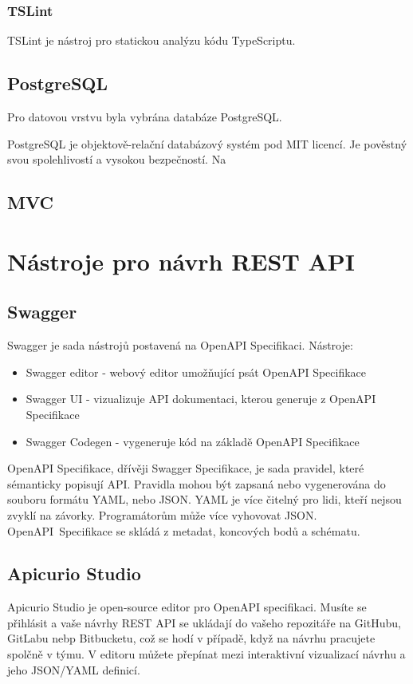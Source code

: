 \documentclass[thesis=B,czech]{FITthesis}[2012/06/26]
\begin{document}
        \subsubsection{TSLint}
            TSLint je nástroj pro statickou analýzu kódu TypeScriptu.
        \subsection{PostgreSQL}
            Pro datovou vrstvu byla vybrána databáze PostgreSQL.
            
            PostgreSQL je objektově-relační databázový systém pod MIT licencí. Je pověstný svou spolehlivostí a vysokou bezpečností. Na %
        \subsection{MVC}
    \section{Nástroje pro návrh REST API}
        \subsection{Swagger}
            Swagger je sada nástrojů postavená na OpenAPI Specifikaci.
            \newline Nástroje:
            \begin{itemize}
                \item Swagger editor - webový editor umožňující psát OpenAPI Specifikace
                \item Swagger UI - vizualizuje API dokumentaci, kterou generuje z OpenAPI Specifikace
                \item Swagger Codegen - vygeneruje kód na základě OpenAPI Specifikace
            \end{itemize}
            OpenAPI Specifikace, dřívěji Swagger Specifikace, je sada pravidel, které sémanticky popisují API. Pravidla mohou být zapsaná nebo vygenerována do souboru formátu YAML, nebo JSON. YAML je více čitelný pro lidi, kteří nejsou zvyklí na závorky. Programátorům může více vyhovovat JSON. OpenAPI~Specifikace se skládá z metadat, koncových bodů a schématu.
        \subsection{Apicurio Studio}
            Apicurio Studio je open-source editor pro OpenAPI specifikaci. Musíte se přihlásit a vaše návrhy REST API se ukládají do vašeho repozitáře na GitHubu, GitLabu nebp Bitbucketu, což se hodí v případě, když na návrhu pracujete spolčně v týmu. V editoru můžete přepínat mezi interaktivní vizualizací návrhu a jeho JSON/YAML definicí.
\end{document}
